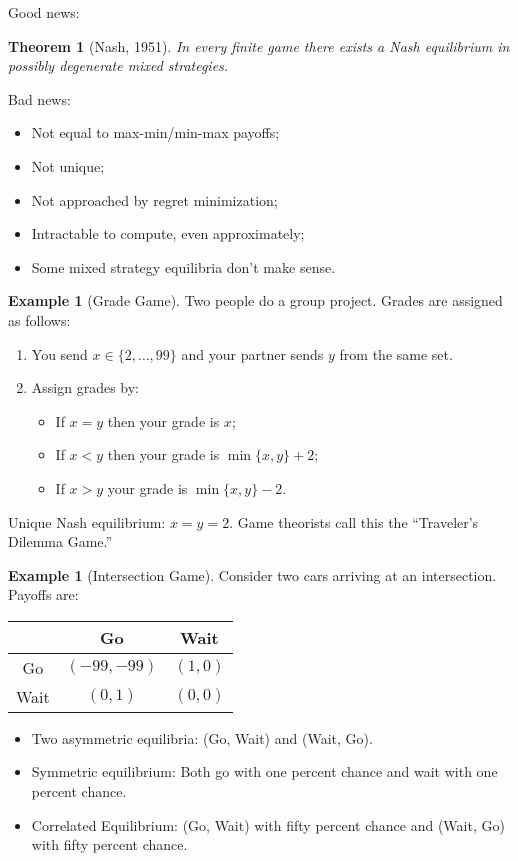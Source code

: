 \documentclass[dvipsnames]{article}
\newtheorem{theorem}{Theorem}[section]
\theoremstyle{definition}
\newtheorem{example}[definition]{Example}
\theoremstyle{remark}
\begin{document}
Good news:

\begin{theorem}[Nash, 1951]
	In every finite game there exists a Nash equilibrium in possibly degenerate mixed strategies.
\end{theorem}

Bad news:
\begin{itemize}
	\item Not equal to max-min/min-max payoffs;
	\item Not unique;
	\item Not approached by regret minimization;
	\item Intractable to compute, even approximately;
	\item Some mixed strategy equilibria don't make sense.
\end{itemize}

\begin{example}[Grade Game]
	Two people do a group project. Grades are assigned as follows:
	\begin{enumerate}
		\item You send $x \in \{2,\dots,99\}$ and your partner sends $y$ from the same set.
		\item Assign grades by:
		\begin{itemize}
			\item If $x = y$ then your grade is $x$;
			\item If $x < y$ then your grade is $\min \{x,y\}+2$;
			\item If $x > y$ your grade is $\min \{x,y\}-2$.
		\end{itemize}
	\end{enumerate}
	Unique Nash equilibrium: $x = y = 2$. Game theorists call this the ``Traveler's Dilemma Game.''
\end{example}

\begin{example}[Intersection Game]
	Consider two cars arriving at an intersection. Payoffs are:
	\begin{table}[h]\centering
		\begin{tabular}{c|c|c|}
			& Go & Wait \\ \hline
			Go & $(-99,-99)$ & $(1,0)$  \\ \hline
			Wait & $(0,1)$ & $(0,0)$ \\ \hline
		\end{tabular}
	\end{table}
\begin{itemize}
		\item Two asymmetric equilibria: (Go, Wait) and (Wait, Go).
		\item Symmetric equilibrium: Both go with one percent chance and wait with one percent chance. 
		\item Correlated Equilibrium: (Go, Wait) with fifty percent chance and (Wait, Go) with fifty percent chance.
\end{itemize}
\end{example}
\end{document}

